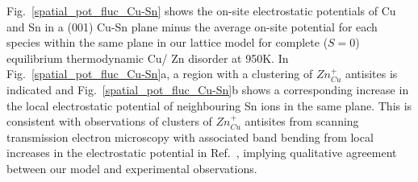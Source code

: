 \documentclass[11pt, twoside]{report}
\begin{document}


Fig.~\ref{spatial_pot_fluc_Cu-Sn} shows the on-site electrostatic potentials of Cu and Sn in a (001) Cu-Sn plane minus the average on-site potential for each species within the same plane in our {\CZTS} lattice model for complete ($S=0$) equilibrium thermodynamic Cu/ Zn disorder at 950K. In Fig.~\ref{spatial_pot_fluc_Cu-Sn}a, a region with a clustering of $Zn_{Cu}^{+}$ antisites is indicated and Fig.~\ref{spatial_pot_fluc_Cu-Sn}b shows a corresponding increase in the local electrostatic potential of neighbouring Sn ions in the same plane. This is consistent with observations of clusters of $Zn_{Cu}^{+}$ antisites from scanning transmission electron microscopy with associated band bending from local increases in the electrostatic potential in Ref.~, implying qualitative agreement between our model and experimental observations.
\end{document}
